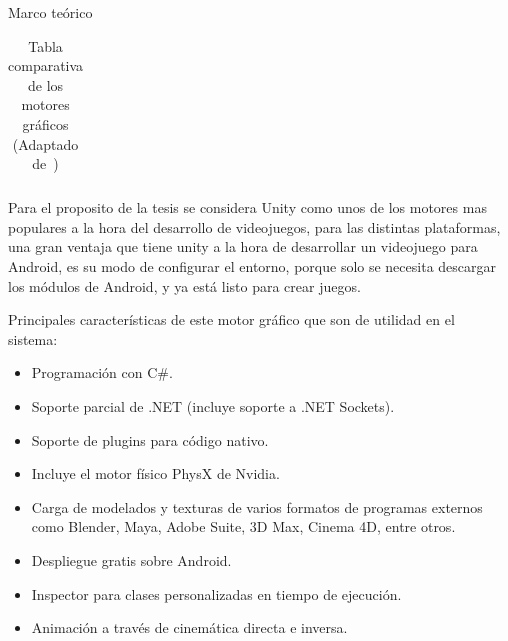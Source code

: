 \begin{thesischapter}{1} {Marco teórico}
\begin{table}[ht]
\begin{tabularx}{\textwidth}{|X|X|X|X|X|X|X|}
        \end{tabularx}
        \label{tab: graphics-engines}
        \caption{ Tabla comparativa de los motores gráficos \\ (Adaptado de~\cite{gonjar2019desarrollo})}
    \end{table}
    
    
    \vspace{10pt}
    Para el proposito de la tesis se considera Unity como unos de los motores mas populares a la hora del desarrollo
    de videojuegos, para las distintas plataformas, una gran ventaja que tiene unity a la hora de
    desarrollar un videojuego para Android, es su modo de configurar el entorno, porque solo se necesita descargar los módulos de 
    Android, y ya está listo para crear juegos.
     
    \vspace{5pt}
    Principales características de este motor gráfico que son de utilidad en el sistema:~\cite{unity3d}
    \begin{itemize}
        \item Programación con C\#.
        \item Soporte parcial de .NET (incluye soporte a .NET Sockets).
        \item Soporte de plugins para código nativo.
        \item Incluye el motor físico PhysX de Nvidia.
        \item Carga de modelados y texturas de varios formatos de programas externos como Blender, Maya, Adobe Suite, 3D Max, Cinema 4D, entre otros.
        \item Despliegue gratis sobre Android.
        \item Inspector para clases personalizadas en tiempo de ejecución.
        \item Animación a través de cinemática directa e inversa.
    \end{itemize}


\end{thesischapter}
